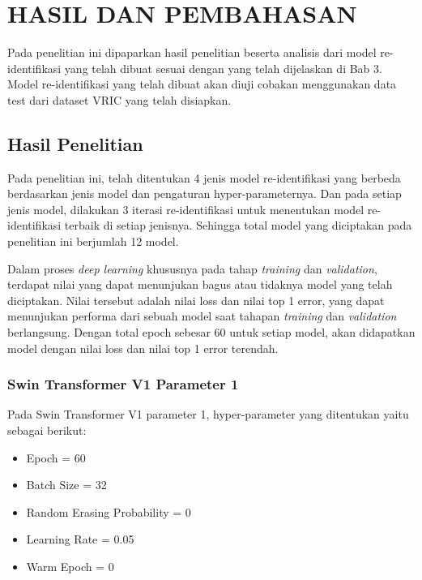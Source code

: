 \chapter{HASIL DAN PEMBAHASAN}
\label{chap:hasildanpembahasan}


Pada penelitian ini dipaparkan hasil penelitian beserta analisis dari model re-identifikasi yang telah dibuat sesuai dengan 
yang telah dijelaskan di Bab 3. Model re-identifikasi yang telah dibuat akan diuji cobakan menggunakan data test dari dataset 
VRIC yang telah disiapkan. 

\section{Hasil Penelitian}
\label{sec:hasilpenelitian}

Pada penelitian ini, telah ditentukan 4 jenis model re-identifikasi yang berbeda berdasarkan jenis model dan pengaturan 
hyper-parameternya. Dan pada setiap jenis model, dilakukan 3 iterasi re-identifikasi untuk menentukan model re-identifikasi 
terbaik di setiap jenisnya. Sehingga total model yang diciptakan pada penelitian ini berjumlah 12 model. 

Dalam proses \emph{deep learning} khususnya pada tahap \emph{training} dan \emph{validation}, terdapat nilai yang dapat 
menunjukan bagus atau tidaknya model yang telah diciptakan. Nilai tersebut adalah nilai loss dan nilai top 1 error, yang 
dapat menunjukan performa dari sebuah model saat tahapan \emph{training} dan \emph{validation} berlangsung. Dengan total 
epoch sebesar 60 untuk setiap model, akan didapatkan model dengan nilai loss dan nilai top 1 error terendah. 

\subsection{Swin Transformer V1 Parameter 1}

Pada Swin Transformer V1 parameter 1, hyper-parameter yang ditentukan yaitu sebagai berikut:

\begin{itemize}[nolistsep]
  \item Epoch = 60
  \item Batch Size = 32
  \item Random Erasing Probability = 0
  \item Learning Rate = 0.05
  \item Warm Epoch = 0
\end{itemize}

